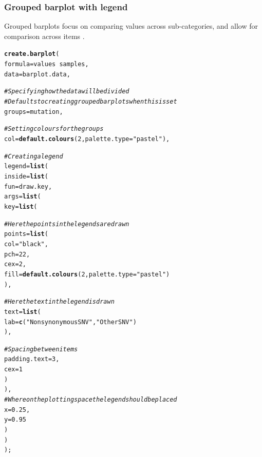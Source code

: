 \documentclass[letterpaper]{article}\usepackage[]{graphicx}\usepackage[]{color}
\makeatletter
\newcommand{\hlnum}[1]{\textcolor[rgb]{0.686,0.059,0.569}{#1}}%
\newcommand{\hlstr}[1]{\textcolor[rgb]{0.192,0.494,0.8}{#1}}%
\newcommand{\hlcom}[1]{\textcolor[rgb]{0.678,0.584,0.686}{\textit{#1}}}%
\newcommand{\hlopt}[1]{\textcolor[rgb]{0,0,0}{#1}}%
\newcommand{\hlstd}[1]{\textcolor[rgb]{0.345,0.345,0.345}{#1}}%
\newcommand{\hlkwc}[1]{\textcolor[rgb]{0.333,0.667,0.333}{#1}}%
\newcommand{\hlkwd}[1]{\textcolor[rgb]{0.737,0.353,0.396}{\textbf{#1}}}%
\newenvironment{kframe}{%
 \def\at@end@of@kframe{}%
 \ifinner\ifhmode%
  \def\at@end@of@kframe{\end{minipage}}%
  \begin{minipage}{\columnwidth}%
 \fi\fi%
 \def\FrameCommand##1{\hskip\@totalleftmargin \hskip-\fboxsep
 \colorbox{shadecolor}{##1}\hskip-\fboxsep
     \hskip-\linewidth \hskip-\@totalleftmargin \hskip\columnwidth}%
 \MakeFramed {\advance\hsize-\width
   \@totalleftmargin\z@ \linewidth\hsize
   \@setminipage}}%
 {\par\unskip\endMakeFramed%
 \at@end@of@kframe}
\newenvironment{knitrout}{}{} %
\makeatother
\begin{document}
\subsubsection{Grouped barplot with legend}
Grouped barplots focus on comparing values across sub-categories, and allow  for comparison across items \cite{streit}.

\begin{knitrout}
\color{fgcolor}\begin{kframe}
\begin{alltt}
\hlkwd{create.barplot}\hlstd{(}
    \hlkwc{formula} \hlstd{= values} \hlopt{~} \hlstd{samples,}
    \hlkwc{data} \hlstd{= barplot.data,}

    \hlcom{# Specifying how the data will be divided}
    \hlcom{# Defaults to creating grouped bar plots when this is set}
    \hlkwc{groups} \hlstd{= mutation,}

    \hlcom{# Setting colours for the groups}
    \hlkwc{col} \hlstd{=} \hlkwd{default.colours}\hlstd{(}\hlnum{2}\hlstd{,} \hlkwc{palette.type} \hlstd{=} \hlstr{"pastel"}\hlstd{),}

    \hlcom{# Creating a legend }
    \hlkwc{legend} \hlstd{=} \hlkwd{list}\hlstd{(}
        \hlkwc{inside} \hlstd{=} \hlkwd{list}\hlstd{(}
            \hlkwc{fun} \hlstd{= draw.key,}
            \hlkwc{args} \hlstd{=} \hlkwd{list}\hlstd{(}
                \hlkwc{key} \hlstd{=} \hlkwd{list}\hlstd{(}

                    \hlcom{# Here the points in the legends are drawn}
                    \hlkwc{points} \hlstd{=} \hlkwd{list}\hlstd{(}
                        \hlkwc{col} \hlstd{=} \hlstr{"black"}\hlstd{,}
                        \hlkwc{pch} \hlstd{=} \hlnum{22}\hlstd{,}
                        \hlkwc{cex} \hlstd{=} \hlnum{2}\hlstd{,}
                        \hlkwc{fill} \hlstd{=} \hlkwd{default.colours}\hlstd{(}\hlnum{2}\hlstd{,} \hlkwc{palette.type} \hlstd{=} \hlstr{"pastel"}\hlstd{)}
                        \hlstd{),}

                    \hlcom{# Here the text in the legend is drawn}
                    \hlkwc{text} \hlstd{=} \hlkwd{list}\hlstd{(}
                        \hlkwc{lab} \hlstd{=} \hlkwd{c}\hlstd{(}\hlstr{"Nonsynonymous SNV"}\hlstd{,} \hlstr{"Other SNV"}\hlstd{)}
                        \hlstd{),}

                    \hlcom{# Spacing between items}
                    \hlkwc{padding.text} \hlstd{=} \hlnum{3}\hlstd{,}
                    \hlkwc{cex} \hlstd{=} \hlnum{1}
                    \hlstd{)}
                \hlstd{),}
            \hlcom{# Where on the plotting space the legend should be placed}
            \hlkwc{x} \hlstd{=} \hlnum{0.25}\hlstd{,}
            \hlkwc{y} \hlstd{=} \hlnum{0.95}
            \hlstd{)}
        \hlstd{)}
    \hlstd{);}
\end{alltt}
\end{kframe}\begin{figure}[]



\end{figure}
\end{knitrout}
\end{document}
